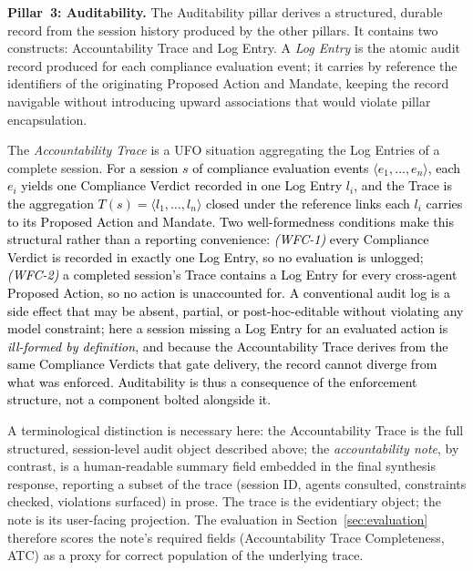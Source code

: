 \documentclass[runningheads]{llncs}
\begin{document}
\vspace{3pt}
\textbf{Pillar~3: Auditability.}
The Auditability pillar derives a structured, durable record from the session history produced by the other pillars. It contains two constructs: Accountability Trace and Log Entry.
A \textit{Log Entry} is the atomic audit record produced for each compliance evaluation event; it carries by reference the
identifiers of the originating Proposed Action and Mandate, keeping the record navigable without introducing upward associations that would violate pillar encapsulation.

The \textit{Accountability Trace} is a UFO situation aggregating the Log Entries of a complete session. \textcolor{black}{For a session $s$ of compliance evaluation events $\langle e_1,\dots,e_n\rangle$,  each $e_i$ yields one Compliance Verdict recorded in one Log Entry $l_i$,  and the Trace is the aggregation $T(s)=\langle l_1,\dots,l_n\rangle$  closed under the reference links each $l_i$ carries to its Proposed  Action and Mandate. Two well-formedness conditions make this structural rather than a reporting convenience: \textit{(WFC-1)} every Compliance  Verdict is recorded in exactly one Log Entry, so no evaluation is unlogged; \textit{(WFC-2)} a completed session's Trace contains a Log  Entry for every cross-agent Proposed Action, so no action is unaccounted for. 
A conventional audit log is a side effect that may be absent, partial, or post-hoc-editable without violating any model constraint; here a session missing a Log Entry for an evaluated action is \emph{ill-formed by definition}, and because the Accountability Trace derives from the same Compliance Verdicts that gate delivery, the record cannot diverge from what was enforced. Auditability is thus a consequence of the enforcement structure, not a component bolted alongside it.}

A terminological distinction is necessary here: the Accountability Trace is the full structured, session-level audit object described above; the \emph{accountability note}, by contrast, is a human-readable summary field embedded in the final synthesis response, reporting a subset of the trace (session ID, agents consulted, constraints checked, violations surfaced) in prose. The trace is the evidentiary object; the note is its user-facing projection. The evaluation in Section~\ref{sec:evaluation} therefore scores the note's required fields (Accountability Trace Completeness, ATC) as a proxy for correct population of the underlying trace.
\end{document}
